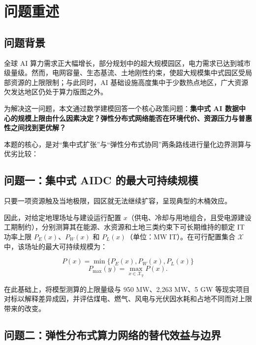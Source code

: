 \section{问题重述}\label{sec:restate}

\subsection{问题背景}\label{sec:background}

全球 AI 算力需求正大幅增长，部分规划中的超大规模园区，电力需求已达到城市级量级。然而，电网容量、生态基流、土地刚性约束，使超大规模集中式园区受局部资源的上限限制；与此同时，AI 基础设施高度集中于少数热点地区，广大资源欠发达地区仍处于算力版图之外。

为解决这一问题，本文通过数学建模回答一个核心政策问题：\textbf{集中式 AI 数据中心的规模上限由什么因素决定？弹性分布式网络能否在环境代价、资源压力与普惠性之间找到更优解？}

本题的核心，是对“集中式扩张”与“弹性分布式协同”两条路线进行量化边界测算与优劣比较：

\subsection{问题一：集中式 AIDC 的最大可持续规模}\label{sec:problem1}

只要一项资源触及当地极限，园区就无法继续扩容，呈现典型的木桶效应。

因此，对给定地理场址与建设运行配置 $x$（供电、冷却与用地组合，且受电源建设工期制约），分别测算其在能源、水资源和土地三类约束下可长期维持的额定 IT 功率上限 $P_E(x)$、$P_W(x)$ 和 $P_L(x)$（单位：MW IT）。在可行配置集合 $\mathcal X$ 中，该场址的最大可持续规模为：

\begin{equation}\label{eq:p-capacity}
P(x)=\min\{P_E(x),P_W(x),P_L(x)\}
\end{equation}
\begin{equation}\label{eq:p-max}
P_{\max}(y)=\max_{x\in\mathcal X_y}P(x).
\end{equation}

在此基础上，将模型测算的上限量级与 950 MW、2,263 MW、5 GW 等现实项目对标以解释差异成因，并评估煤电、燃气、风电与光伏因水耗和占地不同而对上限带来的改变。

\subsection{问题二：弹性分布式算力网络的替代效益与边界}\label{sec:problem2}

